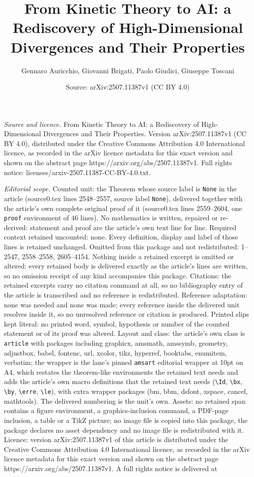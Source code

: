 \documentclass[10pt,a4paper]{amsart}
\title[From Kinetic Theory to AI: a Rediscovery of High-Dimensional]{From Kinetic Theory to AI: a Rediscovery of High-Dimensional Divergences and Their Properties}
\author{Gennaro Auricchio, Giovanni Brigati, Paolo Giudici, Giuseppe Toscani}
\date{Source: arXiv:2507.11387v1 (CC BY 4.0)}
\begin{document}
\maketitle

\noindent\emph{Source and licence.} From Kinetic Theory to AI: a Rediscovery of High-Dimensional Divergences and Their Properties. Version arXiv:2507.11387v1 (CC BY 4.0), distributed under the Creative Commons Attribution 4.0 International licence, as recorded in the arXiv licence metadata for this exact version and shown on the abstract page https://arxiv.org/abs/2507.11387v1. Full rights notice: licenses/arxiv-2507.11387-CC-BY-4.0.txt.\par\smallskip

\noindent\textit{Editorial scope.} Counted unit: the Theorem whose source label is \texttt{None} in the article (source0.tex lines 2548--2557, source label \texttt{None}), delivered together with the article's own complete original proof of it (source0.tex lines 2559--2604, one \texttt{proof} environment of 46 lines). No mathematics is written, repaired or re-derived: statement and proof are the article's own text line for line. Required context retained uncounted: none. Every definition, display and label of those lines is retained unchanged. Omitted from this package and not redistributed: 1--2547, 2558--2558, 2605--4154. Nothing inside a retained excerpt is omitted or altered: every retained body is delivered exactly as the article's lines are written, so no omission receipt of any kind accompanies this package. Citations: the retained excerpts carry no citation command at all, so no bibliography entry of the article is transcribed and no reference is redistributed. Reference adaptation: none was needed and none was made; every reference inside the delivered unit resolves inside it, so no unresolved reference or citation is produced. Printed slips kept literal: no printed word, symbol, hypothesis or number of the counted statement or of its proof was altered. Layout and class: the article's own class is \texttt{article} with packages including graphicx, amsmath, amssymb, geometry, adjustbox, babel, fontenc, url, xcolor, tikz, hyperref, booktabs, enumitem, verbatim; the wrapper is the lane's pinned \texttt{amsart} editorial wrapper at 10pt on A4, which restates the theorem-like environments the retained text needs and adds the article's own macro definitions that the retained text needs (\texttt{\textbackslash Id}, \texttt{\textbackslash bx}, \texttt{\textbackslash by}, \texttt{\textbackslash erre}, \texttt{\textbackslash le}), with extra wrapper packages (bm, bbm, dsfont, xspace, cancel, mathtools). The delivered numbering is the unit's own. Assets: no retained span contains a figure environment, a graphics-inclusion command, a PDF-page inclusion, a table or a TikZ picture; no image file is copied into this package, the package declares no asset dependency and no image file is redistributed with it. Licence: version arXiv:2507.11387v1 of this article is distributed under the Creative Commons Attribution 4.0 International licence, as recorded in the arXiv licence metadata for this exact version and shown on the abstract page https://arxiv.org/abs/2507.11387v1. A full rights notice is delivered at 
\end{document}
